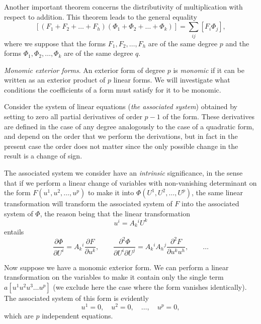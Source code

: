 \documentclass[leqno,11pt]{book}
\numberwithin{equation}{chapter}
\newcommand{\pd}{\partial}
\theoremstyle{shape1}
\theoremstyle{shape0}
\theoremstyle{shape2}
\theoremstyle{definition}
\begin{document}
Another important theorem concerns the distributivity of multiplication with respect to addition. This theorem leads to the general equality
\[
  [(F_{1}+F_{2}+\dots+F_{h})(\Phi_{1}+\Phi_{2}+\dots+\Phi_{k})]=\sum_{ij}[F_{i}\Phi_{j}],
\]
where we suppose that the forms $F_{1},F_{2},\dots,F_{h}$ are of the same degree $p$ and the forms $\Phi_{1},\Phi_{2},\dots,\Phi_{k}$ are of the same degree $q$.

\vspace{12pt}\fsec \emph{Monomic exterior forms}. An exterior form of degree $p$ is \emph{monomic} if it can be written as an exterior product of $p$ linear forms. We will investigate what conditions the coefficients of a form must satisfy for it to be monomic.

Consider the system of linear equations (\emph{the associated system})  obtained by setting to zero all  partial derivatives of order $p-1$ of the form. These derivatives are defined in the case of any degree analogously to the case of a quadratic form, and depend on the order that we perform the derivations, but in fact in the present case the order does not matter since the only possible change in the result is a change of sign.

The associated system we consider have an \emph{intrinsic} significance, in the sense that if we perform a linear change of variables with non-vanishing determinant on the form $F(u^{1},u^{2},\dots,u^{p})$ to make it into $\Phi(U^{1},U^{2},\dots,U^{p})$, the same linear transformation will transform the associated system of $F$ into the associated system of $\Phi$, the reason being that the linear transformation
\[
u^{i}=A_{k}{}^{i}U^{k}
\]
entails
\[
\frac{\pd\Phi}{\pd U^{i}}=A_{k}{}^{i}\frac{\pd F}{\pd u^{k}},\qquad \frac{\pd^{2}\Phi}{\pd U^{i}\pd U^{j}}=A_{k}{}^{i}A_{h}{}^{j}\frac{\pd^{2}F}{\pd u^{k}u^{h}},\qquad\dots
\]

Now suppose we have a monomic exterior form. We can perform a linear transformation on the variables to make it contain only the single term $a[u^{1}u^{2}u^{3}\dots u^{p}]$ (we exclude here the case where the form vanishes identically). The associated system of this form is evidently
\[
u^{1}=0,\quad u^{2}=0,\quad\dots,\quad u^{p}=0,
\]
which are $p$ independent equations.
\end{document}
